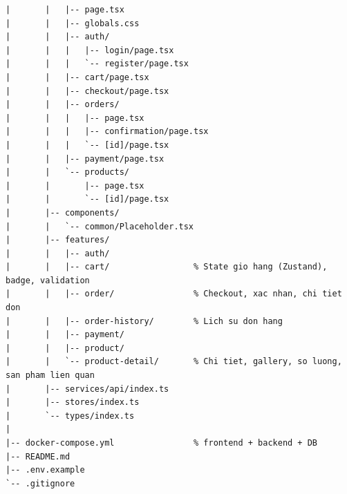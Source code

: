 \documentclass[11pt,a4paper]{article}
\begin{document}
\begin{verbatim}
|       |   |-- page.tsx
|       |   |-- globals.css
|       |   |-- auth/
|       |   |   |-- login/page.tsx
|       |   |   `-- register/page.tsx
|       |   |-- cart/page.tsx
|       |   |-- checkout/page.tsx
|       |   |-- orders/
|       |   |   |-- page.tsx
|       |   |   |-- confirmation/page.tsx
|       |   |   `-- [id]/page.tsx
|       |   |-- payment/page.tsx
|       |   `-- products/
|       |       |-- page.tsx
|       |       `-- [id]/page.tsx
|       |-- components/
|       |   `-- common/Placeholder.tsx
|       |-- features/
|       |   |-- auth/
|       |   |-- cart/                 % State gio hang (Zustand), badge, validation
|       |   |-- order/                % Checkout, xac nhan, chi tiet don
|       |   |-- order-history/        % Lich su don hang
|       |   |-- payment/
|       |   |-- product/
|       |   `-- product-detail/       % Chi tiet, gallery, so luong, san pham lien quan
|       |-- services/api/index.ts
|       |-- stores/index.ts
|       `-- types/index.ts
|
|-- docker-compose.yml                % frontend + backend + DB
|-- README.md
|-- .env.example
`-- .gitignore
\end{verbatim}
\end{document}
